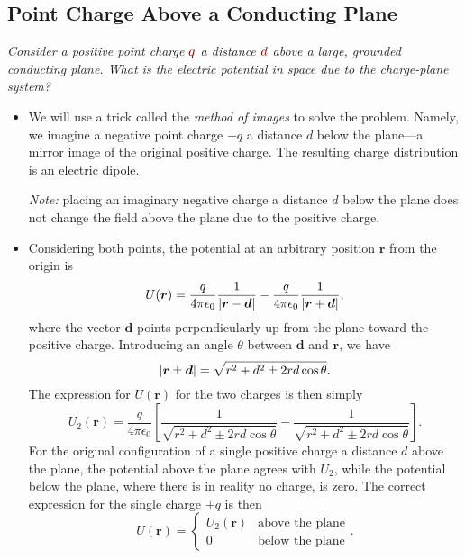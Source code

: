 \documentclass[11pt, a4paper]{article}
\newcommand{\dmath}[1]{\textcolor{Maroon}{#1}}  %
\renewcommand{\vec}[1]{\bm{#1}} %
\renewcommand{\r}{\vec{r}}
\newcommand{\ee}{\epsilon_{0}}  %
\begin{document}
\subsection{Point Charge Above a Conducting Plane}
\textit{Consider a positive point charge $ \dmath{q} $ a distance $ \dmath{d} $ above a large, grounded conducting plane. What is the electric potential in space due to the charge-plane system?}
\begin{itemize}
	\item We will use a trick called the \textit{method of images} to solve the problem. 
	Namely, we imagine a negative point charge $ -q $ a distance $ d $ below the plane---a mirror image of the original positive charge. The resulting charge distribution is an electric dipole. 
	
	\textit{Note:} placing an imaginary negative charge a distance $ d $ below the plane does not change the field above the plane due to the positive charge. 
	
	\item Considering both points, the potential at an arbitrary position $ \r $ from the origin is
	\begin{equation*}
		U(\r) = \frac{q}{4\pi \ee}\frac{1}{\abs{\r - \vec{d}}} - \frac{q}{4\pi \ee}\frac{1}{\abs{\r + \vec{d}}},
	\end{equation*}
	where the vector $ \vec{d} $ points perpendicularly up from the plane toward the positive charge. Introducing an angle $ \theta $ between $ \vec{d} $ and $ \r $, we have
	\begin{equation*}
		\abs{\r \pm \vec{d}} = \sqrt{r^{2}+d^{2} \pm 2rd\cos \theta}.
	\end{equation*}
	The expression for $ U(\r) $ for the two charges is then simply
	\begin{equation*}
		U_{2}(\r) = \frac{q}{4\pi \ee}\left[\frac{1}{\sqrt{r^{2}+d^{2} \pm 2rd\cos \theta}} - \frac{1}{\sqrt{r^{2}+d^{2} \pm 2rd\cos \theta}}\right].
	\end{equation*}
	For the original configuration of a single positive charge a distance $ d $ above the plane, the potential above the plane agrees with $ U_{2} $, while the potential below the plane, where there is in reality no charge, is zero. The correct expression for the single charge $ +q $ is then
	\begin{equation*}
		U(\r) = 
		\begin{cases}
			U_{2}(\r) & \text{above the plane}\\
			0 & \text{below the plane}
		\end{cases}.
	\end{equation*}
	

\end{itemize}
\end{document}
